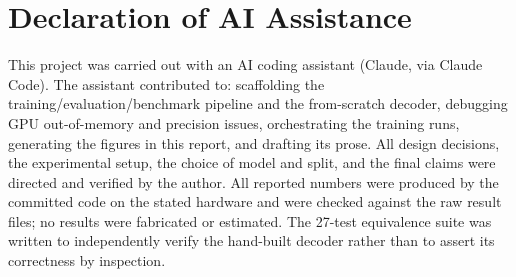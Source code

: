 \documentclass[conference]{IEEEtran}
\begin{document}
\appendices
\section{Declaration of AI Assistance}
This project was carried out with an AI coding assistant (Claude, via Claude
Code). The assistant contributed to: scaffolding the training/evaluation/benchmark
pipeline and the from-scratch decoder, debugging GPU out-of-memory and
precision issues, orchestrating the training runs, generating the figures in this
report, and drafting its prose. All design decisions, the experimental setup, the
choice of model and split, and the final claims were directed and verified by the
author. All reported numbers were produced by the committed code on the stated
hardware and were checked against the raw result files; no results were fabricated
or estimated. The 27-test equivalence suite was written to independently verify
the hand-built decoder rather than to assert its correctness by inspection.



\end{document}
